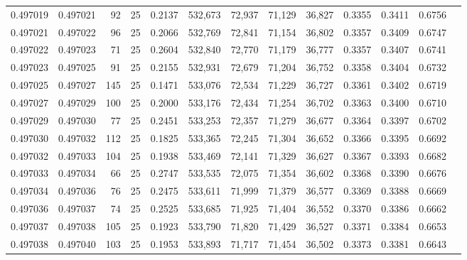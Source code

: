 \begin{tabular}{rrrrrrrrrrrrr}
0.497019 & 0.497021 &    92 &  25 &                                     0.2137 & 532,673 &  72,937 &  71,129 &  36,827 & 0.3355 & 0.3411 & 0.6756 \\
0.497021 & 0.497022 &    96 &  25 &                                     0.2066 & 532,769 &  72,841 &  71,154 &  36,802 & 0.3357 & 0.3409 & 0.6747 \\
0.497022 & 0.497023 &    71 &  25 &                                     0.2604 & 532,840 &  72,770 &  71,179 &  36,777 & 0.3357 & 0.3407 & 0.6741 \\
0.497023 & 0.497025 &    91 &  25 &                                     0.2155 & 532,931 &  72,679 &  71,204 &  36,752 & 0.3358 & 0.3404 & 0.6732 \\
0.497025 & 0.497027 &   145 &  25 &                                     0.1471 & 533,076 &  72,534 &  71,229 &  36,727 & 0.3361 & 0.3402 & 0.6719 \\
0.497027 & 0.497029 &   100 &  25 &                                     0.2000 & 533,176 &  72,434 &  71,254 &  36,702 & 0.3363 & 0.3400 & 0.6710 \\
0.497029 & 0.497030 &    77 &  25 &                                     0.2451 & 533,253 &  72,357 &  71,279 &  36,677 & 0.3364 & 0.3397 & 0.6702 \\
0.497030 & 0.497032 &   112 &  25 &                                     0.1825 & 533,365 &  72,245 &  71,304 &  36,652 & 0.3366 & 0.3395 & 0.6692 \\
0.497032 & 0.497033 &   104 &  25 &                                     0.1938 & 533,469 &  72,141 &  71,329 &  36,627 & 0.3367 & 0.3393 & 0.6682 \\
0.497033 & 0.497034 &    66 &  25 &                                     0.2747 & 533,535 &  72,075 &  71,354 &  36,602 & 0.3368 & 0.3390 & 0.6676 \\
0.497034 & 0.497036 &    76 &  25 &                                     0.2475 & 533,611 &  71,999 &  71,379 &  36,577 & 0.3369 & 0.3388 & 0.6669 \\
0.497036 & 0.497037 &    74 &  25 &                                     0.2525 & 533,685 &  71,925 &  71,404 &  36,552 & 0.3370 & 0.3386 & 0.6662 \\
0.497037 & 0.497038 &   105 &  25 &                                     0.1923 & 533,790 &  71,820 &  71,429 &  36,527 & 0.3371 & 0.3384 & 0.6653 \\
0.497038 & 0.497040 &   103 &  25 &                                     0.1953 & 533,893 &  71,717 &  71,454 &  36,502 & 0.3373 & 0.3381 & 0.6643 \\

\end{tabular}
